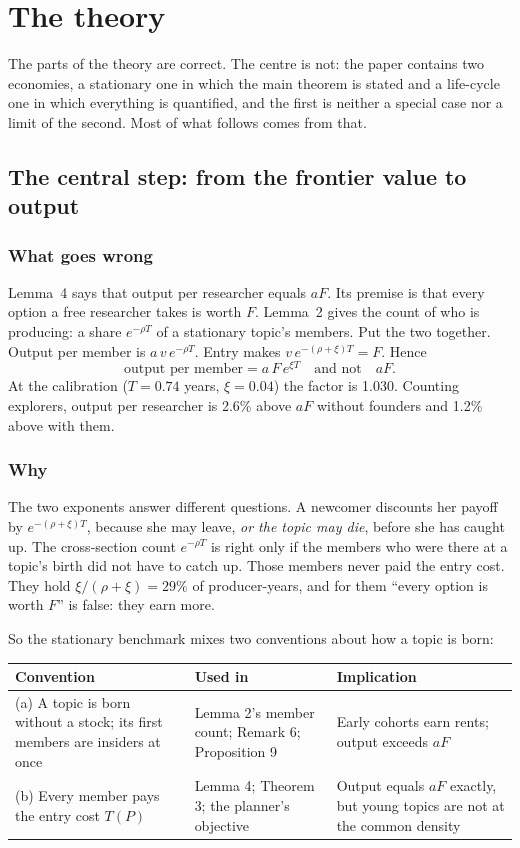 \section{The theory}\label{sec:crit-theory}

The parts of the theory are correct. The centre is not: the paper contains two economies, a stationary one in which the main theorem is stated and a life-cycle one in which everything is quantified, and the first is neither a special case nor a limit of the second. Most of what follows comes from that.

\subsection{The central step: from the frontier value to output}\label{sec:crit-lemma4}

\subsubsection{What goes wrong}
Lemma~4 says that output per researcher equals $aF$. Its premise is that every option a free researcher takes is worth $F$. Lemma~2 gives the count of who is producing: a share $e^{-\rho T}$ of a stationary topic's members. Put the two together. Output per member is $a\,v\,e^{-\rho T}$. Entry makes $v\,e^{-(\rho+\xi)T}=F$. Hence
\[
\text{output per member}=a\,F\,e^{\xi T}\quad\text{and not}\quad aF .
\]
At the calibration ($T=0.74$ years, $\xi=0.04$) the factor is 1.030. Counting explorers, output per researcher is 2.6\% above $aF$ without founders and 1.2\% above with them.

\subsubsection{Why}
The two exponents answer different questions. A newcomer discounts her payoff by $e^{-(\rho+\xi)T}$, because she may leave, \emph{or the topic may die}, before she has caught up. The cross-section count $e^{-\rho T}$ is right only if the members who were there at a topic's birth did not have to catch up. Those members never paid the entry cost. They hold $\xi/(\rho+\xi)=29\%$ of producer-years, and for them ``every option is worth $F$'' is false: they earn more.

So the stationary benchmark mixes two conventions about how a topic is born:

\begin{center}\small
\begin{tabularx}{\textwidth}{@{}P{2.1in}LL@{}}
\toprule
Convention & Used in & Implication \\
\midrule
(a) A topic is born without a stock; its first members are insiders at once & Lemma 2's member count; Remark 6; Proposition 9 & Early cohorts earn rents; output exceeds $aF$ \\
(b) Every member pays the entry cost $T(P)$ & Lemma 4; Theorem 3; the planner's objective & Output equals $aF$ exactly, but young topics are not at the common density \\
\bottomrule
\end{tabularx}
\end{center}

